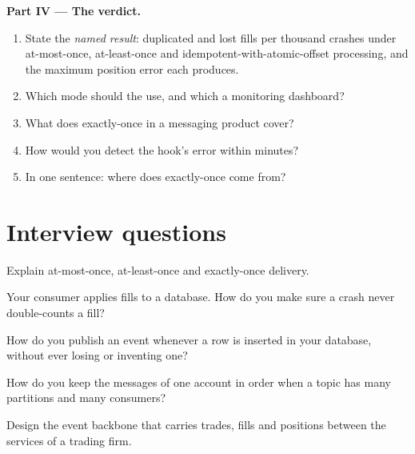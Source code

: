 \begin{problem}
\medskip\noindent\textbf{Part IV --- The verdict.}
\begin{enumerate}[resume]
\item State the \emph{named result}: duplicated and lost fills per thousand crashes under at-most-once, at-least-once and
idempotent-with-atomic-offset processing, and the maximum position error each produces.
\item Which mode should the  use, and which a monitoring dashboard?
\item What does exactly-once in a messaging product cover?
\item How would you detect the hook's error within minutes?
\item In one sentence: where does exactly-once come from?
\end{enumerate}
\end{problem}

\section{Interview questions}

\begin{interviewq}\label{iq:pl:messaging-and-event-driven-architecture:1}
Explain at-most-once, at-least-once and exactly-once delivery.
\end{interviewq}

\begin{interviewq}\label{iq:pl:messaging-and-event-driven-architecture:2}
Your consumer applies fills to a database. How do you make sure a crash never double-counts a fill?
\end{interviewq}

\begin{interviewq}\label{iq:pl:messaging-and-event-driven-architecture:3}
How do you publish an event whenever a row is inserted in your database, without ever losing or inventing one?
\end{interviewq}

\begin{interviewq}\label{iq:pl:messaging-and-event-driven-architecture:4}
How do you keep the messages of one account in order when a topic has many partitions and many consumers?
\end{interviewq}

\begin{interviewq}\label{iq:pl:messaging-and-event-driven-architecture:5}
Design the event backbone that carries trades, fills and positions between the services of a trading firm.
\end{interviewq}
